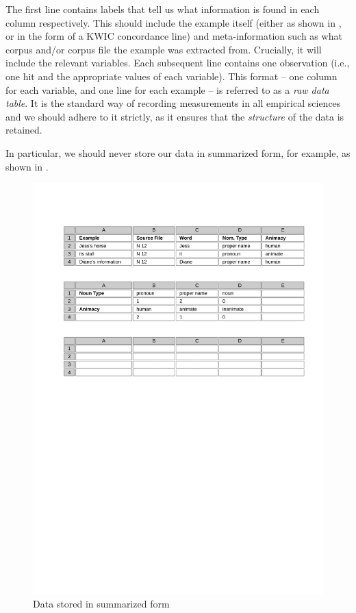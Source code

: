 The first line contains labels that tell us what information is found in each column respectively. This should include the example itself (either as shown in , or in the form of a KWIC concordance  line) and meta\hyp{}information such as what corpus and\slash or corpus file the example was extracted  from. Crucially, it will include the relevant variables. Each subsequent line contains one observation  (i.e., one hit  and the appropriate values of each variable). This format -- one column for each variable, and one line for each example -- is referred to as a \textit{raw data table}. It is the standard way of recording measurements  in all empirical sciences and we should adhere to it strictly, as it ensures that the \emph{structure} of the data is retained.

In particular, we should never store  our data in summarized form, for example, as shown in .

\begin{figure}
\caption{Data stored in summarized form}
\label{fig:storingdatawrong}
\includegraphics[width=\textwidth,keepaspectratio]{figures/storingdatawrong}
\end{figure}

